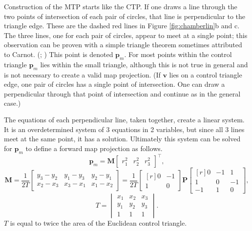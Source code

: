 \documentclass[]{interact}
\begin{document}
Construction of the MTP starts like the CTP. If one draws a line through the two
points of intersection of each pair of circles, that line is perpendicular to
the triangle edge. These are the dashed red lines in Figure
\ref{fig:chamberlin}b and c. The three lines, one for each pair of circles,
appear to meet at a single point; this observation can be proven with a simple
triangle theorem sometimes attributed to Carnot. (\citealp{posamentier};
\citealp{wohlgemuth}) This point is denoted $\mathbf p_m$. For most points
within the control triangle $\mathbf p_m$ lies within the small triangle,
although this is not true in general and is not necessary to create a valid map
projection. (If $\mathbf v$ lies on a control triangle edge, one pair of circles
has a single point of intersection. One can draw a perpendicular through
that point of intersection and continue as in the general case.)

The equations of each perpendicular line, taken together, create a linear
system. It is an overdetermined system of 3 equations in 2 variables, but since
all 3 lines meet at the same point, it has a solution. Ultimately this system
can be solved for $\mathbf p_m$ to define a forward map projection as follows.
\begin{equation}\label{eq:forward}%
\mathbf p_m =
\mathbf M \begin{bmatrix*} r^2_1 & r^2_2 & r^2_3 \end{bmatrix*}^\top,
\end{equation}
\begin{equation}\label{eq:forwardm}
\mathbf M = \frac{1}{2T}
\begin{bmatrix*} y_3 - y_2 & y_1 - y_3 & y_2 - y_1 \\
x_2 - x_3 & x_3 - x_1 & x_1 - x_2 \end{bmatrix*} = \frac{1}{2T}
\begin{bmatrix*}[r] 0 & -1  \\
1 & 0 \end{bmatrix*}
\mathbf P
\begin{bmatrix*}[r] 0 & -1 & 1 \\
1 & 0 & -1 \\
-1 & 1 & 0 \end{bmatrix*},
\end{equation}
\begin{equation}\label{eq:forwardt}
T = \begin{vmatrix*} x_1 & x_2 & x_3 \\
 y_1 & y_2 & y_3 \\
 1 & 1 & 1
\end{vmatrix*}.
\end{equation}
$T$ is equal to twice the area of the Euclidean control triangle.
\end{document}
